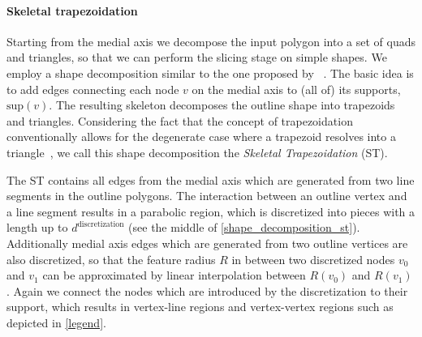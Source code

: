 \paragraph{Skeletal trapezoidation}
Starting from the medial axis we decompose the input polygon into a set of quads and triangles, so that we can perform the slicing stage on simple shapes.
We employ a shape decomposition similar to the one proposed by \citeauthor{Ding2016a}~\cite{Ding2016a}. 
The basic idea is to add edges connecting each node $v$ on the medial axis to (all of) its supports, $\text{sup}(v)$. 
The resulting skeleton decomposes the outline shape into trapezoids and triangles.
Considering the fact that the concept of trapezoidation conventionally allows for the degenerate case where a trapezoid resolves into a triangle~\cite{chazelle1984,fournier1984}, we call this shape decomposition the \emph{Skeletal Trapezoidation} (ST).





The ST contains all edges from the medial axis which are generated from two line segments in the outline polygons.
The interaction between an outline vertex and a line segment results in a parabolic region, which is discretized into pieces with a length up to $d^\text{discretization}$ (see the middle of \cref{shape_decomposition_st}).
Additionally medial axis edges which are generated from two outline vertices are also discretized, so that the feature radius $R$ in between two discretized nodes $v_0$ and $v_1$ can be approximated by linear interpolation between $R(v_0)$ and $R(v_1)$.
Again we connect the nodes which are introduced by the discretization to their support, which results in vertex-line regions and vertex-vertex regions such as depicted in \cref{legend}.



